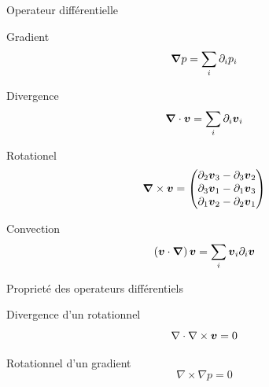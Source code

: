 \begin{frame}{Operateur différentielle}

\begin{block}{Gradient}
\begin{equation*}
 {\boldsymbol {\nabla}}p=\sum_{i}\partial_{i}p_{i}
\end{equation*}
\end{block}

\begin{block}{Divergence}
\begin{equation*}
 {\boldsymbol {\nabla}}\cdot {\boldsymbol {v}}=\sum_{i}\partial_{i}{\boldsymbol {v}}_{i}
\end{equation*}
\end{block}

\begin{block}{Rotationel}
\begin{equation*}
 {\boldsymbol {\nabla}} \times {\boldsymbol {v}}=\begin{pmatrix}
                                \partial_{2}{\boldsymbol {v}}_{3}-\partial_{3}{\boldsymbol {v}}_{2}\\
                                \partial_{3}{\boldsymbol {v}}_{1}-\partial_{1}{\boldsymbol {v}}_{3}\\
                                \partial_{1}{\boldsymbol {v}}_{2}-\partial_{2}{\boldsymbol {v}}_{1}\\
                               \end{pmatrix}
 \end{equation*}
\end{block}


\begin{block}{Convection}
\begin{equation*}
 \left({\boldsymbol {v}}\cdot {\boldsymbol {\nabla}}\right){\boldsymbol {v}}=\sum_{i} {\boldsymbol {v}}_{i}\partial_{i} {\boldsymbol {v}}
 \end{equation*}
\end{block}


\end{frame}
\begin{frame}[<+->]{Proprieté des operateurs différentiels}
 \begin{property}{Divergence d'un rotationnel}
  \begin{equation*}
  \nabla \cdot \nabla \times {\boldsymbol {v}}=0
  \end{equation*}
 \end{property}

 \begin{property}{Rotationnel d'un gradient}
  \begin{equation*}
  \nabla \times \nabla p=0
  \end{equation*}
 \end{property}
\end{frame}
